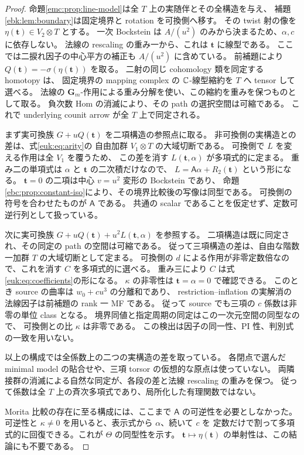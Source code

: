 \begin{proof}
命題\ref{emc:prop:line-model}は全 $T$ 上の実随伴とその全構造を与え、
補題\ref{ebk:lem:boundary}は固定境界と rotation を可換側へ移す。
その twist 射の像を $\eta(\mathbf t)\in V_2\otimes T$ とする。
一次 Bockstein は $A/(u^2)$ のみから決まるため、$\alpha,c$ に依存しない。
法線の rescaling の重み一から、これは $\mathbf t$ に線型である。
ここでは二捩れ因子の中心平方の補正も $A/(u^2)$ に含めている。
前補題により $Q(\mathbf t)=-\sigma(\eta(\mathbf t))$ を取る。
二射の同じ cohomology 類を同定する homotopy は、
固定境界の mapping complex の $\mathbb C$-線型縮約を $T$ へ tensor して選べる。
法線の $\mathbf G_m$-作用による重み分解を使い、この縮約を重みを保つものとして取る。
負次数 Hom の消滅により、その path の選択空間は可縮である。
これで underlying counit arrow が全 $T$ 上で同定される。

まず実可換族 $G+uQ(\mathbf t)$ を二項構造の参照点に取る。
非可換側の実構造との差は、式\eqref{euk:eq:arity}の
自由加群 $V_1\otimes T$ の大域切断である。
可換側で $L$ を変える作用は全 $V_1$ を覆うため、
この差を消す $L(\mathbf t,\alpha)$ が多項式的に定まる。
重み二の単項式は $\alpha$ と $\mathbf t$ の二次積だけなので、
$L=\mathsf A\alpha+R_2(\mathbf t)$ という形になる。
$\mathbf t=0$ の二項は中心 $v=u^2$ 変形の Bockstein であり、
命題\ref{ebc:prop:constant-iso}により、その境界比較後の写像は同型である。
可換側の符号を合わせたものが $\mathsf A$ である。
共通の scalar であることを仮定せず、定数可逆行列として扱っている。

次に実可換族 $G+uQ(\mathbf t)+u^2L(\mathbf t,\alpha)$ を参照する。
二項構造は既に同定され、その同定の path の空間は可縮である。
従って三項構造の差は、自由な階数一加群 $T$ の大域切断として定まる。
可換側の $d$ による作用が非零定数倍なので、これを消す $C$ を多項式的に選べる。
重み三により $C$ は式\eqref{euk:eq:coefficients}の形になる。
$\kappa$ の非零性は $\mathbf t=\alpha=0$ で確認できる。
このとき source の曲率は $w_0+cu^3$ の分離和であり、
restriction--inflation の実解消の法線因子は前補題の rank 一 MF である。
従って source でも三項の $c$ 係数は非零の単位 class となる。
境界同値と指定周期の同定はこの一次元空間の同型なので、
可換側との比 $\kappa$ は非零である。
この検出は因子の同一性、PI 性、判別式の一致を用いない。

以上の構成では全係数上の二つの実構造の差を取っている。
各閉点で選んだ minimal model の貼合せや、三項 torsor の仮想的な原点は使っていない。
両隣接群の消滅による自然な同定が、各段の差と法線 rescaling の重みを保つ。
従って係数は全 $T$ 上の斉次多項式であり、局所化した有理関数ではない。

Morita 比較の存在に至る構成には、ここまで $\mathsf A$ の可逆性を必要としなかった。
可逆性と $\kappa\ne0$ を用いると、表示式から $\alpha$、続いて $c$ を
定数だけで割って多項式的に回復できる。これが $\Theta$ の同型性を示す。
$\mathbf t\mapsto\eta(\mathbf t)$ の単射性は、この結論にも不要である。
\end{proof}

